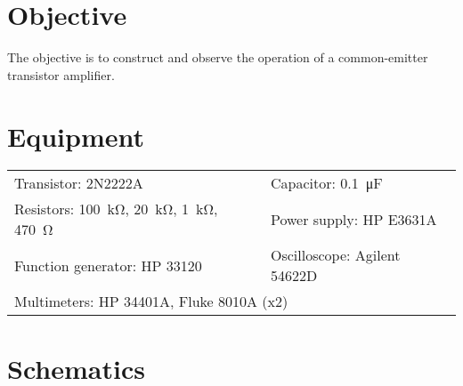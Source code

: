 

\section{Objective}

The objective is to construct and observe the operation of a common-emitter transistor amplifier.

\section{Equipment}

\begin{tabular}{ll}
  \centering
  Transistor: 2N2222A               &  Capacitor: \SI{0.1}{\micro\farad}           \\
  Resistors: \SI{100}{\kilo\ohm}, \SI{20}{\kilo\ohm}, \SI{1}{\kilo\ohm}, \SI{470}{\ohm} &    Power supply: HP E3631A \\
  Function generator: HP 33120  & Oscilloscope: Agilent 54622D \\
  \multicolumn{2}{l}{Multimeters: HP 34401A, Fluke 8010A (x2)} \\
\end{tabular}

\section{Schematics}



